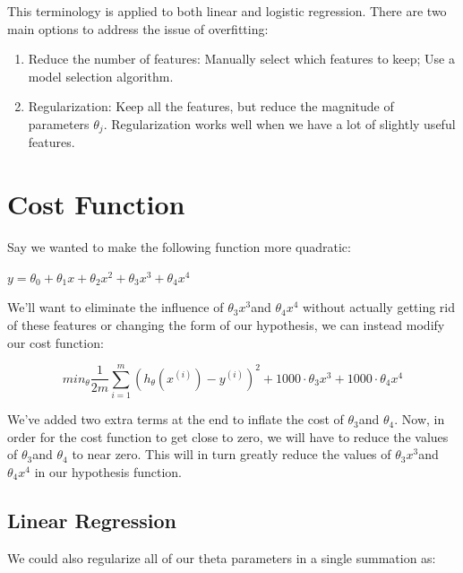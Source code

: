 This terminology is applied to both linear and logistic regression. There are two main options to address the issue of overfitting:\\

\begin{enumerate}
\item Reduce the number of features: Manually select which features to keep; Use a model selection algorithm.
\item Regularization: Keep all the features, but reduce the magnitude of parameters $ \theta_j $. Regularization works well when we have a lot of slightly useful features.
\end{enumerate}

\section{Cost Function}

Say we wanted to make the following function more quadratic:

\begin{center}
$ y = \theta_0 + \theta_1x + \theta_2x^2 + \theta_3x^3 + \theta_4x^4$
\end{center}

We'll want to eliminate the influence of $ \theta_3x^3 $and $ \theta_4x^4 $ without actually getting rid of these features or changing the form of our hypothesis, we can instead modify our cost function:\\

\begin{center}
$$min_\theta   \frac{1}{2m}\sum_{i=1}^{m}\left(h_\theta(x^{(i)}) - y^{(i)}\right)^2 + 1000\cdot \theta_3x^3 + 1000\cdot \theta_4x^4 $$
\end{center}

We've added two extra terms at the end to inflate the cost of $ \theta_3 $and $ \theta_4 $. Now, in order for the cost function to get close to zero, we will have to reduce the values of $ \theta_3 $and $ \theta_4 $ to near zero. This will in turn greatly reduce the values of $ \theta_3 x^3 $and $ \theta_4x^4 $ in our hypothesis function.\\

\subsection{Linear Regression}

We could also regularize all of our theta parameters in a single summation as:\\

